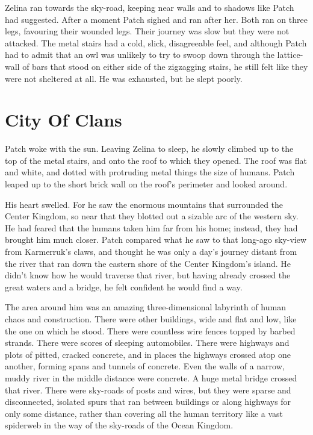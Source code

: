 \documentclass[12pt]{book}
\begin{document}
 Zelina ran towards the sky-road, keeping near walls and to shadows like Patch had suggested. After a moment Patch sighed and ran after her. Both ran on three legs, favouring their wounded legs. Their journey was slow but they were not attacked. The metal stairs had a cold, slick, disagreeable feel, and although Patch had to admit that an owl was unlikely to try to swoop down through the lattice-wall of bars that stood on either side of the zigzagging stairs, he still felt like they were not sheltered at all. He was exhausted, but he slept poorly.\par

\section{City Of Clans}

 Patch woke with the sun. Leaving Zelina to sleep, he slowly climbed up to the top of the metal stairs, and onto the roof to which they opened. The roof was flat and white, and dotted with protruding metal things the size of humans. Patch leaped up to the short brick wall on the roof's perimeter and looked around.\par
His heart swelled. For he saw the enormous mountains that surrounded the Center Kingdom, so near that they blotted out a sizable arc of the western sky. He had feared that the humans taken him far from his home; instead, they had brought him much closer. Patch compared what he saw to that long-ago sky-view from Karmerruk's claws, and thought he was only a day's journey distant from the river that ran down the eastern shore of the Center Kingdom's island. He didn't know how he would traverse that river, but having already crossed the great waters and a bridge, he felt confident he would find a way.\par
 The area around him was an amazing three-dimensional labyrinth of human chaos and construction. There were other buildings, wide and flat and low, like the one on which he stood. There were countless wire fences topped by barbed strands. There were scores of sleeping automobiles. There were highways and plots of pitted, cracked concrete, and in places the highways crossed atop one another, forming spans and tunnels of concrete. Even the walls of a narrow, muddy river in the middle distance were concrete. A huge metal bridge crossed that river. There were sky-roads of posts and wires, but they were sparse and disconnected, isolated spurs that ran between buildings or along highways for only some distance, rather than covering all the human territory like a vast spiderweb in the way of the sky-roads of the Ocean Kingdom.\par
\end{document}
